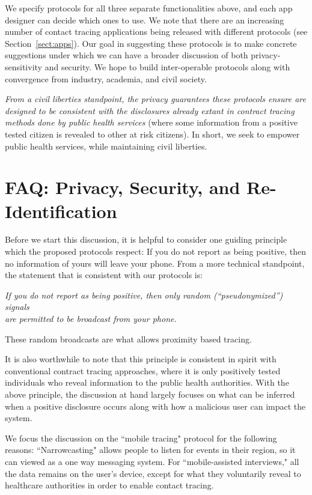 \documentclass{article}
\begin{document}
 We specify protocols for all three separate functionalities above, and each app designer can decide which ones to use. We note that there are an increasing number of contact tracing applications being released with different protocols (see Section~\ref{sect:apps}). Our goal in suggesting these protocols is to make concrete suggestions under which we can have a broader discussion of both privacy-sensitivity and security. We hope to build inter-operable protocols along with convergence from industry, academia, and civil society.
 
 \emph{From a civil liberties standpoint, the privacy guarantees these protocols ensure are designed to be consistent with the disclosures already extant in contract tracing methods done by public health services} (where some information from a positive tested citizen is revealed to other at risk citizens). In short, we seek to empower public health services, while maintaining civil liberties.

\section{FAQ: Privacy, Security, and Re-Identification} \label{sect:FAQ}

Before we start this discussion, it is helpful to consider one guiding principle which the proposed protocols respect:
 If you do not report as being positive, then no information of yours will leave your phone. From a more technical standpoint, the statement that is consistent with our protocols is:
\begin{center}
 \emph{If you do not report as being positive, then only random  (``pseudonymized'') signals\\
 are permitted to be broadcast from your phone.} 
\end{center}
These random broadcasts are what allows proximity based tracing. 

It is also worthwhile to note that this principle is consistent in spirit with conventional contract tracing approaches, where it is only positively tested individuals who reveal information to the public health authorities.  With the above principle, the discussion at hand largely focuses on what can be inferred when a positive disclosure occurs along with how a malicious user can impact the system.

We focus the discussion on the ``mobile tracing" protocol for the following reasons:  ``Narrowcasting" allows people to listen for events in their region, so it can viewed as a one way messaging system. For ``mobile-assisted interviews," all the data remains on the user's device, except for what they voluntarily reveal to healthcare authorities in order to enable contact tracing.
\end{document}
